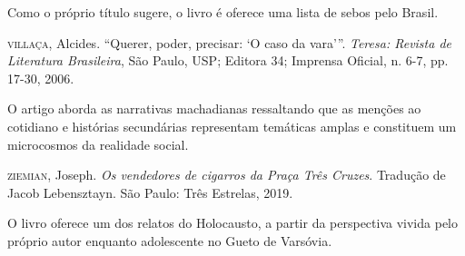 \documentclass[11pt]{extarticle}
\begin{document}
Como o próprio título sugere, o livro é oferece uma lista de sebos pelo Brasil.

\textsc{villaça}, Alcides. ``Querer, poder, precisar: `O caso da vara'''.
\emph{Teresa: Revista de Literatura Brasileira}, São Paulo, USP; Editora
34; Imprensa Oficial, n. 6-7, pp. 17-30, 2006.

O artigo aborda as narrativas machadianas ressaltando que as menções ao cotidiano 
e histórias secundárias representam temáticas amplas e constituem um microcosmos 
da realidade social. 

\textsc{ziemian}, Joseph. \emph{Os vendedores de cigarros da Praça Três Cruzes}.
Tradução de Jacob Lebensztayn. São Paulo: Três Estrelas, 2019.

O livro oferece um dos relatos do Holocausto, a partir da perspectiva vivida pelo 
próprio autor enquanto adolescente no Gueto de Varsóvia.
\end{document}
